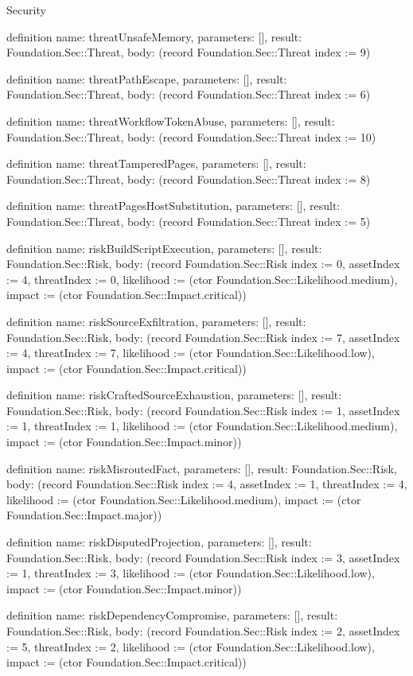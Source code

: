 \begin{lexlean}{Security}
\begin{semanticmodule}
definition{
  name: threatUnsafeMemory,
  parameters: [],
  result: Foundation.Sec::Threat,
  body: (record Foundation.Sec::Threat {index := 9})
}

definition{
  name: threatPathEscape,
  parameters: [],
  result: Foundation.Sec::Threat,
  body: (record Foundation.Sec::Threat {index := 6})
}

definition{
  name: threatWorkflowTokenAbuse,
  parameters: [],
  result: Foundation.Sec::Threat,
  body: (record Foundation.Sec::Threat {index := 10})
}

definition{
  name: threatTamperedPages,
  parameters: [],
  result: Foundation.Sec::Threat,
  body: (record Foundation.Sec::Threat {index := 8})
}

definition{
  name: threatPagesHostSubstitution,
  parameters: [],
  result: Foundation.Sec::Threat,
  body: (record Foundation.Sec::Threat {index := 5})
}

definition{
  name: riskBuildScriptExecution,
  parameters: [],
  result: Foundation.Sec::Risk,
  body: (record Foundation.Sec::Risk {index := 0, assetIndex := 4, threatIndex := 0, likelihood := (ctor Foundation.Sec::Likelihood.medium), impact := (ctor Foundation.Sec::Impact.critical)})
}

definition{
  name: riskSourceExfiltration,
  parameters: [],
  result: Foundation.Sec::Risk,
  body: (record Foundation.Sec::Risk {index := 7, assetIndex := 4, threatIndex := 7, likelihood := (ctor Foundation.Sec::Likelihood.low), impact := (ctor Foundation.Sec::Impact.critical)})
}

definition{
  name: riskCraftedSourceExhaustion,
  parameters: [],
  result: Foundation.Sec::Risk,
  body: (record Foundation.Sec::Risk {index := 1, assetIndex := 1, threatIndex := 1, likelihood := (ctor Foundation.Sec::Likelihood.medium), impact := (ctor Foundation.Sec::Impact.minor)})
}

definition{
  name: riskMisroutedFact,
  parameters: [],
  result: Foundation.Sec::Risk,
  body: (record Foundation.Sec::Risk {index := 4, assetIndex := 1, threatIndex := 4, likelihood := (ctor Foundation.Sec::Likelihood.medium), impact := (ctor Foundation.Sec::Impact.major)})
}

definition{
  name: riskDisputedProjection,
  parameters: [],
  result: Foundation.Sec::Risk,
  body: (record Foundation.Sec::Risk {index := 3, assetIndex := 1, threatIndex := 3, likelihood := (ctor Foundation.Sec::Likelihood.low), impact := (ctor Foundation.Sec::Impact.minor)})
}

definition{
  name: riskDependencyCompromise,
  parameters: [],
  result: Foundation.Sec::Risk,
  body: (record Foundation.Sec::Risk {index := 2, assetIndex := 5, threatIndex := 2, likelihood := (ctor Foundation.Sec::Likelihood.low), impact := (ctor Foundation.Sec::Impact.critical)})
}


\end{semanticmodule}
\end{lexlean}
